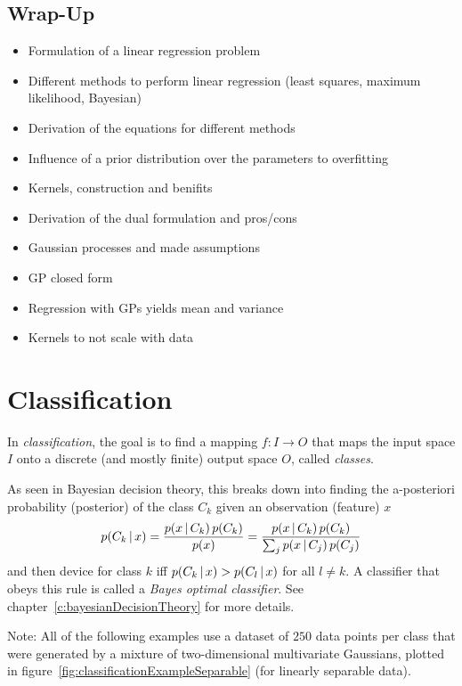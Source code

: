 	\section{Wrap-Up}
		\begin{itemize}
			\item Formulation of a linear regression problem
			\item Different methods to perform linear regression (least squares, maximum likelihood, Bayesian)
			\item Derivation of the equations for different methods
			\item Influence of a prior distribution over the parameters to overfitting
			\item Kernels, construction and benifits
			\item Derivation of the dual formulation and pros/cons
			\item Gaussian processes and made assumptions
			\item GP closed form
			\item Regression with GPs yields mean and variance
			\item Kernels to not scale with data
		\end{itemize}

\chapter{Classification}
	In \emph{classification}, the goal is to find a mapping \( f : I \to O \) that maps the input space \(I\) onto a discrete (and mostly finite) output space \(O\), called \emph{classes}.

	As seen in Bayesian decision theory, this breaks down into finding the a-posteriori probability (posterior) of the class \(C_k\) given an observation (feature) \(x\)
	\begin{equation}
		p(C_k \,\vert\, x) = \frac{p(x \,\vert\, C_k) \, p(C_k)}{p(x)} = \frac{p(x \,\vert\, C_k) \, p(C_k)}{\sum_j p(x \,\vert\, C_j) \, p(C_j)}
	\end{equation}
	and then device for class \(k\) iff \( p(C_k \,\vert\, x) > p(C_l \,\vert\, x) \) for all \( l \neq k \). A classifier that obeys this rule is called a \emph{Bayes optimal classifier}. See chapter~\ref{c:bayesianDecisionTheory} for more details.

	Note: All of the following examples use a dataset of \(250\) data points per class that were generated by a mixture of two-dimensional multivariate Gaussians, plotted in figure~\ref{fig:classificationExampleSeparable} (for linearly separable data).

